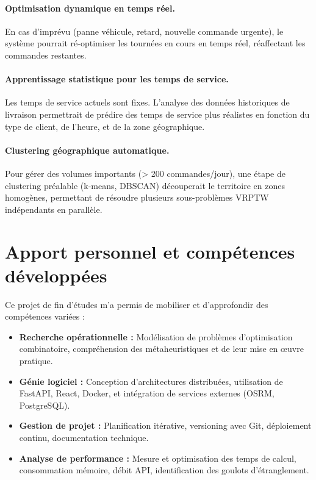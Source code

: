 \documentclass[12pt,a4paper]{report}
\begin{document}
\paragraph{Optimisation dynamique en temps réel.} En cas d'imprévu (panne véhicule, retard, nouvelle commande urgente), le système pourrait ré-optimiser les tournées en cours en temps réel, réaffectant les commandes restantes.

\paragraph{Apprentissage statistique pour les temps de service.} Les temps de service actuels sont fixes. L'analyse des données historiques de livraison permettrait de prédire des temps de service plus réalistes en fonction du type de client, de l'heure, et de la zone géographique.

\paragraph{Clustering géographique automatique.} Pour gérer des volumes importants (> 200 commandes/jour), une étape de clustering préalable (k-means, DBSCAN) découperait le territoire en zones homogènes, permettant de résoudre plusieurs sous-problèmes VRPTW indépendants en parallèle.



\section*{Apport personnel et compétences développées}

Ce projet de fin d'études m'a permis de mobiliser et d'approfondir des compétences variées :

\begin{itemize}[leftmargin=2.2em]
    \item \textbf{Recherche opérationnelle :} Modélisation de problèmes d'optimisation combinatoire, compréhension des métaheuristiques et de leur mise en œuvre pratique.

    \item \textbf{Génie logiciel :} Conception d'architectures distribuées, utilisation de FastAPI, React, Docker, et intégration de services externes (OSRM, PostgreSQL).

    \item \textbf{Gestion de projet :} Planification itérative, versioning avec Git, déploiement continu, documentation technique.

    \item \textbf{Analyse de performance :} Mesure et optimisation des temps de calcul, consommation mémoire, débit API, identification des goulots d'étranglement.
\end{itemize}
\end{document}
